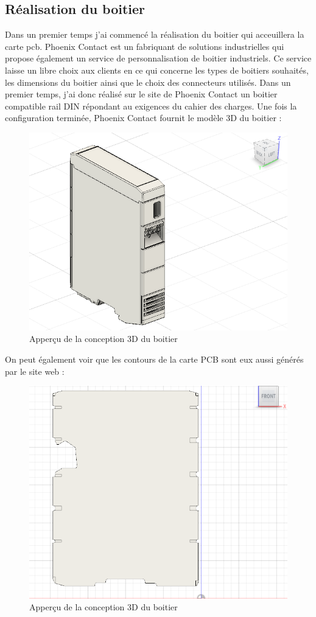 \subsection {Réalisation du boitier } 

Dans un premier temps j'ai commencé la réalisation du boitier qui acceuillera la carte pcb. Phoenix Contact est un fabriquant de solutions industrielles qui propose également un service de personnalisation de boitier industriels. Ce service laisse un libre choix aux clients en ce qui concerne les types de boitiers souhaités, les dimensions du boitier ainsi que le choix des connecteurs utilisés.
\newline
Dans un premier temps, j'ai donc réalisé sur le site de Phoenix Contact un boitier compatible rail DIN répondant au exigences du cahier des charges. Une fois la configuration terminée, Phoenix Contact fournit le modèle 3D du boitier : 
\newpage
\begin{figure}[ht]
    \centering
    \includegraphics[scale=0.35]{img/boitier.PNG}
    \caption{Apperçu de la conception 3D du boitier }
    \label{fig:CameraCmdsettings}
\end{figure}

On peut également voir que les contours de la carte PCB sont eux aussi générés par le site web : 

\begin{figure}[ht]
    \centering
    \includegraphics[scale=0.45]{img/pcb.PNG}
    \caption{Apperçu de la conception 3D du boitier }
    \label{fig:CameraCmdsettings}
\end{figure}

